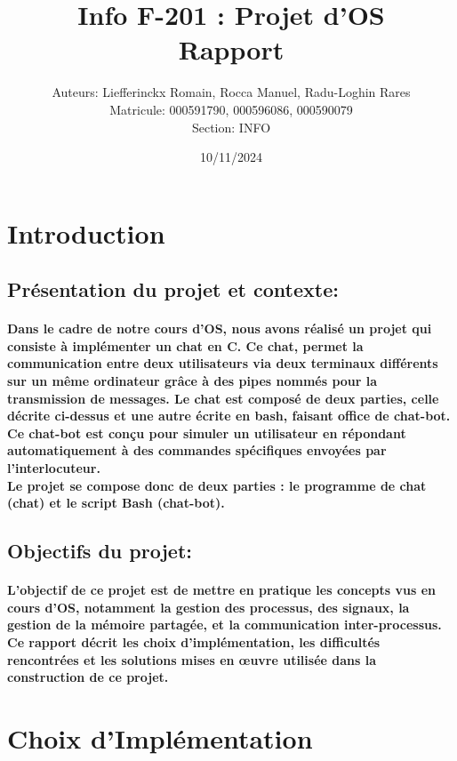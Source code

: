 \documentclass[utf8]{article}
\title{Info F-201 : Projet d’OS \\Rapport}
\author{Auteurs: Liefferinckx Romain, Rocca Manuel, Radu-Loghin Rares\\ Matricule: 000591790, 000596086, 000590079 \\ Section: INFO}
\date{10/11/2024}
\begin{document}
\maketitle
\tableofcontents

\newpage


\section{Introduction}
\subsection{Présentation du projet et contexte:}
\paragraph{Dans le cadre de notre cours d'OS, nous avons réalisé un projet qui consiste à implémenter un chat en C.
Ce chat, permet la communication entre deux utilisateurs via deux terminaux différents sur un même ordinateur grâce à des 
pipes nommés pour la transmission de messages. Le chat est composé de deux parties, celle décrite ci-dessus et une autre écrite en bash,
faisant office de chat-bot. Ce chat-bot est conçu pour simuler un utilisateur en répondant automatiquement à des commandes spécifiques 
envoyées par l’interlocuteur.\\
Le projet se compose donc de deux parties : le programme de chat (chat) et le script Bash (chat-bot).}

\subsection{Objectifs du projet:}
\paragraph{L'objectif de ce projet est de mettre en pratique les concepts vus en cours d'OS, notamment la gestion des processus,
des signaux, la gestion de la mémoire partagée, et la communication inter-processus. 
Ce rapport décrit les choix d'implémentation, les difficultés rencontrées et les solutions mises en œuvre utilisée dans la 
construction de ce projet.}


\section{Choix d’Implémentation}
\end{document}
